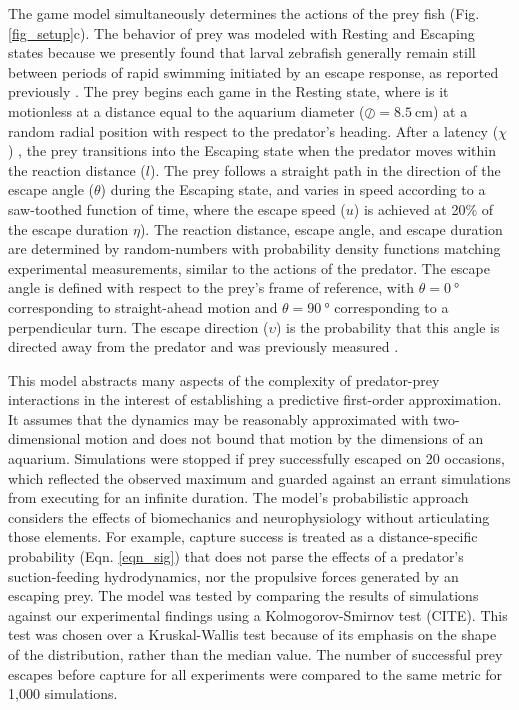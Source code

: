 \documentclass[]{rsos}%
\begin{document}
The game model simultaneously determines the actions of the prey fish (Fig. \ref{fig_setup}c).
The behavior of prey was modeled with Resting and Escaping states because we presently found that larval zebrafish generally remain still between periods of rapid swimming initiated by an escape response, as reported previously \cite{Stewart:2013bha;Stewart:2014cma}. 
The prey begins each game in the Resting state, where is it motionless at a distance equal to the aquarium diameter ($\oslash = \SI{8.5}{\cm}$) at a random radial position with respect to the predator's heading.
After a latency ($\chi$) \cite{Nair:2015gk}, the prey transitions into the Escaping state when the predator moves within the reaction distance ($l$).
The prey follows a straight path in the direction of the escape angle ($\theta$) during the Escaping state, and varies in speed according to a saw-toothed function of time, where the escape speed ($u$) is achieved at 20\% of the escape duration $\eta$).
The reaction distance, escape angle, and escape duration are determined by random-numbers with probability density functions matching experimental measurements, similar to the actions of the predator.
The escape angle is defined with respect to the prey's frame of reference, with $\theta =  \SI{0}{\degree}$ corresponding to straight-ahead motion and $\theta = \SI{90}{\degree}$ corresponding to a perpendicular turn.
The escape direction ($\upsilon$) is the probability that this angle is directed away from the predator and was previously measured \cite{Stewart:2014cma}.

This model abstracts many aspects of the complexity of predator-prey interactions in the interest of establishing a predictive first-order approximation.
It assumes that the dynamics may be reasonably approximated with two-dimensional motion and does not bound that motion by the dimensions of an aquarium. 
Simulations were stopped if prey successfully escaped on 20 occasions, which reflected the observed maximum and guarded against an errant simulations from executing for an infinite duration.
The model's probabilistic approach considers the effects of biomechanics and neurophysiology without articulating those elements.
For example, capture success is treated as a distance-specific probability (Eqn. \ref{eqn_sig}) that does not parse the effects of a predator's suction-feeding hydrodynamics, nor the propulsive forces generated by an escaping prey.
The model was tested by comparing the results of simulations against our experimental findings using a Kolmogorov-Smirnov test (CITE). 
This test was chosen over a Kruskal-Wallis test because of its emphasis on the shape of the distribution, rather than the median value.  
The number of successful prey escapes before capture for all experiments were compared to the same metric for 1,000 simulations.  
\end{document}
